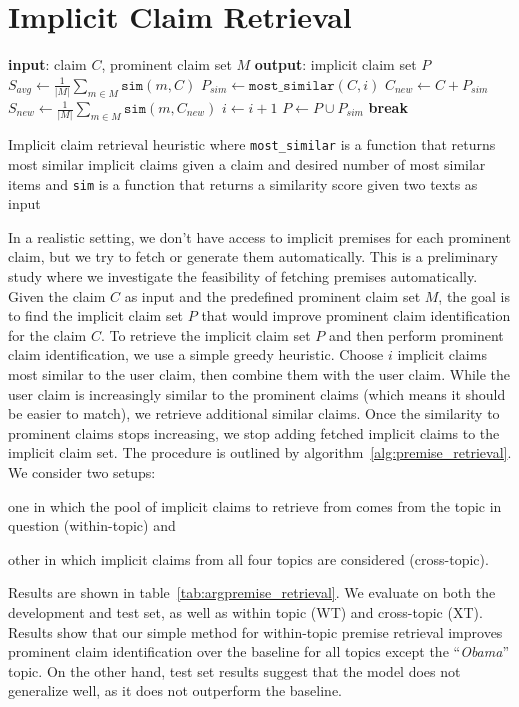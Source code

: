 \section{Implicit Claim Retrieval}
\label{sec:argpremise_retrieval}

\begin{algorithm}[t]
\begin{algorithmic}[1]
\State \textbf{input}: claim $C$, prominent claim set $M$
\State \textbf{output}: implicit claim set $P$
\State
\State $S_{avg} \gets \frac{1}{|M|} \sum_{m \in M} \mathtt{sim}(m, C)$
  \State $P_{sim} \gets \mathtt{most\_similar}(C, i)$
  \State $C_{new} \gets C + P_{sim}$
  \State $S_{new} \gets \frac{1}{|M|} \sum_{m \in M} \mathtt{sim}(m, C_{new})$
  \State
    \State $i \gets i + 1$
    \State $P \gets P \cup P_{sim}$
  \Else
    \State \textbf{break}
  \EndIf
  \State
\EndFor
\end{algorithmic}
\caption{Implicit claim retrieval heuristic where \texttt{most\_similar} is a
	function that returns most similar implicit claims given a claim and
	desired number of most similar items and \texttt{sim} is a function that
	returns a similarity score given two texts as input}
\label{alg:premise_retrieval}
\end{algorithm}

In a realistic setting, we don't have access to implicit premises 
for each prominent claim, but we try to fetch or generate them automatically. 
This is a preliminary study where we investigate the feasibility of fetching 
premises automatically. 
Given the claim $C$ as input and the predefined prominent claim set $M$, the
goal is to find the implicit claim set $P$ that would improve prominent claim
identification for the claim $C$. 
To retrieve the implicit claim set $P$ and then perform prominent claim
identification, we use a simple greedy heuristic. 
Choose $i$ implicit claims most similar to the user claim, then combine them
with the user claim.
While the user claim is increasingly similar to the prominent claims (which
means it should be easier to match), we retrieve additional similar claims. 
Once the similarity to prominent claims stops increasing, we stop
adding fetched implicit claims to the implicit claim set. The procedure 
is outlined by algorithm~\ref{alg:premise_retrieval}.
We consider two setups: 
\begin{enumerate*}[label=(\arabic*)]
\item one in which the pool of implicit claims to retrieve
from comes from the topic in question (within-topic) and 
\item other in which implicit claims from all four topics are considered (cross-topic). 
\end{enumerate*}
Results are shown in table~\ref{tab:argpremise_retrieval}. 
We evaluate on both the development and test set, as well as within topic (WT)
and cross-topic (XT). 
Results show that our simple method for within-topic premise retrieval improves
prominent claim identification over the baseline for all topics except the ``\emph{Obama}'' topic. 
On the other hand, test set results suggest that the model does not generalize well, 
as it does not outperform the baseline. 

